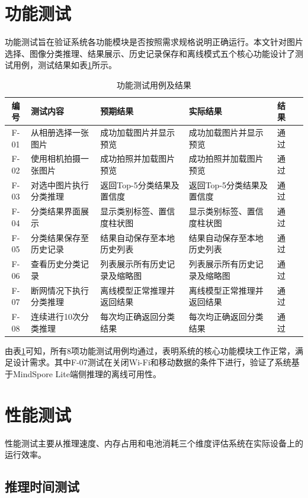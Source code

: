 \section{功能测试}

功能测试旨在验证系统各功能模块是否按照需求规格说明正确运行。本文针对图片选择、图像分类推理、结果展示、历史记录保存和离线模式五个核心功能设计了测试用例，测试结果如表\ref{tab:func-test}所示。

\begin{table}[htbp]
\centering
\caption{功能测试用例及结果}
\label{tab:func-test}
\begin{tabular}{cllllc}
\toprule
编号 & 测试内容 & 预期结果 & 实际结果 & 结果 \\
\midrule
F-01 & 从相册选择一张图片 & 成功加载图片并显示预览 & 成功加载图片并显示预览 & 通过 \\
F-02 & 使用相机拍摄一张图片 & 成功拍照并加载图片预览 & 成功拍照并加载图片预览 & 通过 \\
F-03 & 对选中图片执行分类推理 & 返回Top-5分类结果及置信度 & 返回Top-5分类结果及置信度 & 通过 \\
F-04 & 分类结果界面展示 & 显示类别标签、置信度柱状图 & 显示类别标签、置信度柱状图 & 通过 \\
F-05 & 分类结果保存至历史记录 & 结果自动保存至本地历史列表 & 结果自动保存至本地历史列表 & 通过 \\
F-06 & 查看历史分类记录 & 列表展示所有历史记录及缩略图 & 列表展示所有历史记录及缩略图 & 通过 \\
F-07 & 断网情况下执行分类推理 & 离线模型正常推理并返回结果 & 离线模型正常推理并返回结果 & 通过 \\
F-08 & 连续进行10次分类推理 & 每次均正确返回分类结果 & 每次均正确返回分类结果 & 通过 \\
\bottomrule
\end{tabular}
\end{table}

由表\ref{tab:func-test}可知，所有8项功能测试用例均通过，表明系统的核心功能模块工作正常，满足设计需求。其中F-07测试在关闭Wi-Fi和移动数据的条件下进行，验证了系统基于MindSpore Lite端侧推理的离线可用性。

\section{性能测试}

性能测试主要从推理速度、内存占用和电池消耗三个维度评估系统在实际设备上的运行效率。

\subsection{推理时间测试}

